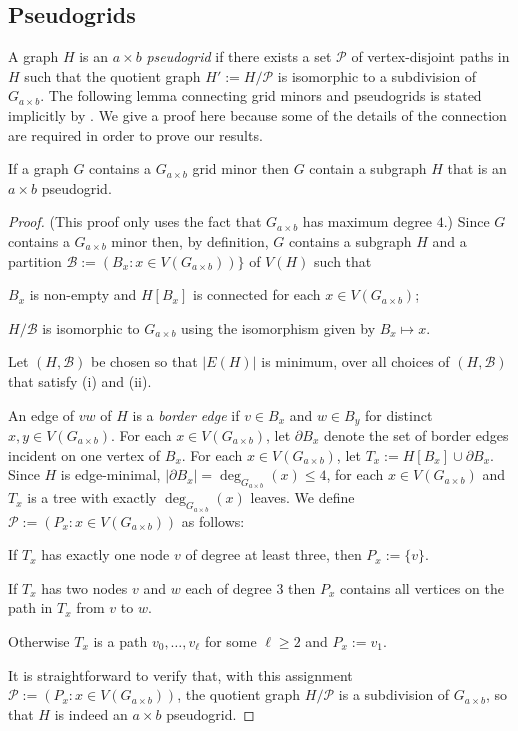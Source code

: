 \documentclass{patmorin}
\begin{document}
\subsection{Pseudogrids}

A graph $H$ is an $a\times b$ \emph{pseudogrid} if there exists a set $\mathcal{P}$ of vertex-disjoint paths in $H$ such that the quotient graph $H':=H/\mathcal{P}$ is isomorphic to a subdivision of $G_{a\times b}$.  The following lemma connecting grid minors and pseudogrids is stated implicitly by \citet{kun.obrien.ea:polynomial}.  We give a proof here because some of the details of the connection are required in order to prove our results.


\begin{lem}\label{pseudogrid_minor}
  If a graph $G$ contains a $G_{a\times b}$ grid minor then $G$ contain a subgraph $H$ that is an $a\times b$ pseudogrid.
\end{lem}

\begin{proof}
  (This proof only uses the fact that $G_{a\times b}$ has maximum degree  $4$.)  Since $G$ contains a $G_{a\times b}$ minor then, by definition, $G$ contains a subgraph $H$ and a partition $\mathcal{B}:=(B_x:x\in V(G_{a\times b}))\}$ of $V(H)$ such that
  \begin{inparaenum}[(i)]
    \item $B_x$ is non-empty and $H[B_x]$ is connected for each $x\in V(G_{a\times b})$;
    \item $H/\mathcal{B}$ is isomorphic to $G_{a\times b}$ using the isomorphism given by $B_x\mapsto x$.
  \end{inparaenum}
  Let $(H,\mathcal{B})$ be chosen so that $|E(H)|$ is minimum, over all choices of $(H,\mathcal{B})$ that satisfy (i) and (ii).

  An edge of $vw$ of $H$ is a \emph{border edge} if $v\in B_x$ and $w\in B_y$ for distinct $x,y\in V(G_{a\times b})$.  For each $x\in V(G_{a\times b})$, let $\partial B_x$ denote the set of border edges incident on one vertex of $B_x$.  For each $x\in V(G_{a\times b})$, let $T_x:= H[B_x]\cup \partial B_x$.   Since $H$ is edge-minimal, $|\partial B_x|=\deg_{G_{a\times b}}(x)\le 4$, for each $x\in V(G_{a\times b})$ and $T_x$ is a tree with exactly $\deg_{G_{a\times b}}(x)$ leaves.  We define $\mathcal{P}:=(P_x:x\in V(G_{a\times b}))$ as follows:
\begin{compactenum}
  \item \label{one_special} If $T_x$ has exactly one node $v$ of degree at least three, then $P_x:=\{v\}$.
  \item \label{two_degree_three} If $T_x$ has two nodes $v$ and $w$ each of degree $3$ then $P_x$ contains all vertices on the path in $T_x$ from $v$ to $w$.
  \item \label{just_a_path} Otherwise $T_x$ is a path $v_0,\ldots,v_\ell$ for some $\ell\ge 2$ and $P_x:=v_1$.
\end{compactenum}
It is straightforward to verify that, with this assignment $\mathcal{P}:=(P_x:x\in V(G_{a\times b}))$, the quotient graph $H/\mathcal{P}$ is a subdivision of $G_{a\times b}$, so that $H$ is indeed an $a\times b$ pseudogrid.
\end{proof}
\end{document}
